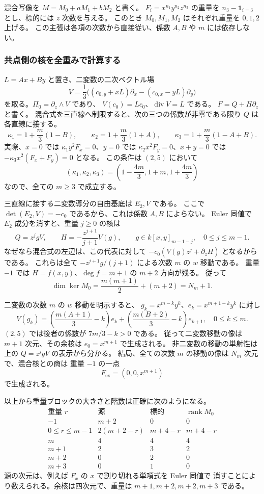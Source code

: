 混合写像を $M=M_0+aM_1+bM_2$ と書く。
$F_i=x^{n_1}y^{n_2}z^{n_3}$ の重量を
$n_3-\mathbf1_{i=3}$ とし、標的には $z$ 次数を与える。
このとき $M_0,M_1,M_2$ はそれぞれ重量を $0,1,2$ 上げる。
この主張は各項の次数から直接従い、係数 $A,B$ や $m$ には依存しない。

\subsubsection*{共点側の核を全重みで計算する}

$L=Ax+By$ と置き、二変数の二次ベクトル場
\[
 V=\frac13\bigl((c_{0,y}+xL)\partial_x
              -(c_{0,x}-yL)\partial_y\bigr)
\]
を取る。$\Pi_0=\partial_z\wedge V$ であり、
$V(c_0)=Lc_0$、$\operatorname{div}V=L$ である。
$F=Q+H\partial_z$ と書く。
混合式を三直線へ制限すると、次の三つの係数が非零である限り $Q$ は各直線に接する。
\[
 \kappa_1=1+\frac m3(1-B),\qquad
 \kappa_2=1+\frac m3(1+A),\qquad
 \kappa_3=1+\frac m3(1-A+B).
\]
実際、$x=0$ では $\kappa_1 y^2F_x=0$、$y=0$ では
$\kappa_2 x^2F_y=0$、$x+y=0$ では
$-\kappa_3x^2(F_x+F_y)=0$ となる。
この条件は $(2,5)$ において
\[
 (\kappa_1,\kappa_2,\kappa_3)
 =\left(1-\frac{4m}3,1+m,1+\frac{4m}3\right)
\]
なので、全ての $m\geq3$ で成立する。

三直線に接する二変数導分の自由基底は $E_2,V$ である。
ここで $\det(E_2,V)=-c_0$ であるから、これは係数 $A,B$ によらない。
Euler 同値で $E_2$ 成分を消すと、重量 $j\geq0$ の核は
\[
 Q=z^jgV,\qquad H=-\frac{z^{j+1}}{j+1}V(g),
 \qquad g\in k[x,y]_{m-1-j},\quad 0\leq j\leq m-1.
\]
なぜなら混合式の左辺は、この代表に対して
$-c_0(V(g)z^j+\partial_zH)$ となるからである。
これらは全て $-z^{j+1}g/(j+1)$ による次数 $m$ の $w$ 移動である。
重量 $-1$ では $H=f(x,y)$、$\deg f=m+1$ の $m+2$ 方向が残る。
従って
\[
 \dim\ker M_0=\frac{m(m+1)}2+(m+2)=N_m+1.
\]

二変数の次数 $m$ の $w$ 移動を明示すると、
$g_k=x^{m-k}y^k$、$e_k=x^{m+1-k}y^k$ に対し
\[
 V(g_k)=\left(\frac{m(A+1)}3-k\right)e_k
       +\left(\frac{m(B+2)}3-k\right)e_{k+1},
 \quad 0\leq k\leq m.
\]
$(2,5)$ では後者の係数が $7m/3-k>0$ である。
従って二変数移動の像は $m+1$ 次元、その余核は $e_0=x^{m+1}$ で生成される。
非二変数の移動の単射性は上の $Q=z^jgV$ の表示から分かる。
結局、全ての次数 $m$ の移動の像は $N_m$ 次元で、混合核との商は
重量 $-1$ の一点
\[
 F_{\mathrm{ex}}=(0,0,x^{m+1})
\]
で生成される。

以上から重量ブロックの大きさと階数は正確に次のようになる。
\[
\begin{array}{c|c|c|c}
 \text{重量 }r&\text{源}&\text{標的}&\operatorname{rank}M_0\\\hline
 -1&m+2&0&0\\
 0\leq r\leq m-1&2(m+2-r)&m+4-r&m+4-r\\
 m&4&4&4\\
 m+1&2&3&2\\
 m+2&0&2&0\\
 m+3&0&1&0
\end{array}
\]
源の次元は、例えば $F_x$ の $x$ で割り切れる単項式を Euler 同値で
消すことにより数えられる。余核は四次元で、重量は
$m+1,m+2,m+2,m+3$ である。

